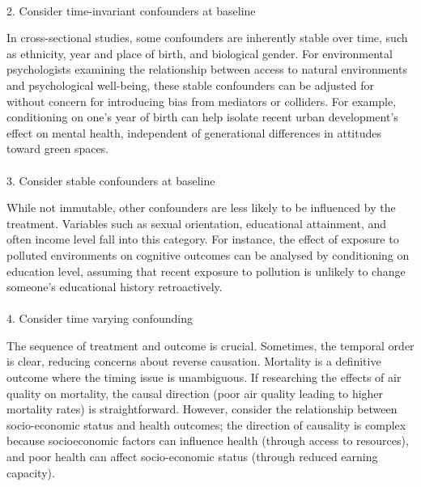 \documentclass[
  singlecolumn]{article}
\makeatletter
\let\oldparagraph\paragraph
\renewcommand{\paragraph}{
    \@ifstar
      \xxxParagraphStar
      \xxxParagraphNoStar
  }
\newcommand{\xxxParagraphStar}[1]{\oldparagraph*{#1}\mbox{}}
\newcommand{\xxxParagraphNoStar}[1]{\oldparagraph{#1}\mbox{}}
\makeatother
\begin{document}
\paragraph{2. Consider time-invariant confounders at
baseline}\label{consider-time-invariant-confounders-at-baseline}

In cross-sectional studies, some confounders are inherently stable over
time, such as ethnicity, year and place of birth, and biological gender.
For environmental psychologists examining the relationship between
access to natural environments and psychological well-being, these
stable confounders can be adjusted for without concern for introducing
bias from mediators or colliders. For example, conditioning on one's
year of birth can help isolate recent urban development's effect on
mental health, independent of generational differences in attitudes
toward green spaces.

\paragraph{3. Consider stable confounders at
baseline}\label{consider-stable-confounders-at-baseline}

While not immutable, other confounders are less likely to be influenced
by the treatment. Variables such as sexual orientation, educational
attainment, and often income level fall into this category. For
instance, the effect of exposure to polluted environments on cognitive
outcomes can be analysed by conditioning on education level, assuming
that recent exposure to pollution is unlikely to change someone's
educational history retroactively.

\paragraph{4. Consider time varying
confounding}\label{consider-time-varying-confounding}

The sequence of treatment and outcome is crucial. Sometimes, the
temporal order is clear, reducing concerns about reverse causation.
Mortality is a definitive outcome where the timing issue is unambiguous.
If researching the effects of air quality on mortality, the causal
direction (poor air quality leading to higher mortality rates) is
straightforward. However, consider the relationship between
socio-economic status and health outcomes; the direction of causality is
complex because socioeconomic factors can influence health (through
access to resources), and poor health can affect socio-economic status
(through reduced earning capacity).
\end{document}
